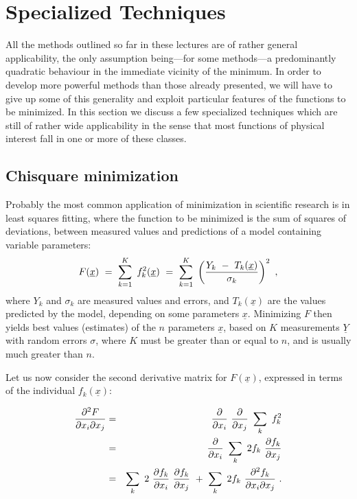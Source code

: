  
\chapter{Specialized Techniques}
 
     All the methods outlined so far in these lectures are of rather
general applicability, the only assumption being---for some methods---a
 predominantly quadratic behaviour in the immediate vicinity of the
minimum. In order to develop more powerful methods than those already
presented, we will have to give up some of this generality and exploit
particular features of the functions to be minimized. In this section
we discuss a few specialized techniques which are still of rather wide
applicability in the sense that most functions of physical interest
fall in one or more of these classes.
 
\section{Chisquare minimization}
 
     Probably the most common application of minimization in scientific
research is in least squares fitting, where the function to be minimized
is the sum of squares of deviations, between measured values and predictions of 
a model containing variable parameters:
$$ 
F({\underline{x}})~=~\sum^{K}_{k=1}~f^2_k ({\underline{x}})~=~\sum^{K}_{k=1}~
\left({Y_k~-~T_k ({\underline{x}})\over \sigma_k}\right)^2~,$$
 where $Y_k$ and $\sigma_k $ are measured values and errors, and $T_k({\underline{x}})$ are the
values predicted by the model, depending on some parameters ${\underline{x}}$.
Minimizing $F$
then yields best values (estimates) of the $n$ parameters ${\underline{x}}$, based on $ K$
measurements ${\underline{Y}}$ with random errors $\sigma$, where $K$ must be greater than or
equal to $n$, and is usually much greater than $n$.
 
     Let us now consider the second derivative matrix for $F({\underline{x}})$, expressed
in terms of the individual $f_k({\underline{x}})$:
 
\begin{eqnarray}
{\partial^2F\over \partial x_i\partial x_j}&=&{\partial\over \partial x_i}~
{\partial\over \partial x_j}~\sum_k~f^2_k\nonumber \\
&=&{\partial\over \partial x_i}~\sum_k~2f_k~{\partial f_k\over \partial x_j}\nonumber \\
&=&\sum_k~2~ {\partial f_k\over \partial x_i}
~{\partial f_k\over \partial x_j}
~+~\sum_k~2f_k~{\partial^2f_k\over \partial x_i \partial x_j}~. \nonumber
\end{eqnarray}
 
